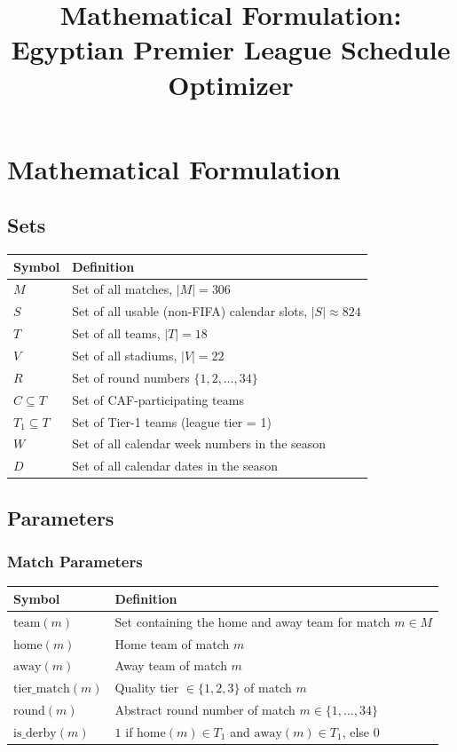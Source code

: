 \documentclass[a4paper,11pt]{article}
\title{Mathematical Formulation: Egyptian Premier League Schedule Optimizer}
\author{}
\date{}
\begin{document}
\maketitle

\section{Mathematical Formulation}

\subsection{Sets}
\begin{table}[h!]
\centering
\begin{tabularx}{\textwidth}{l X}
\toprule
\textbf{Symbol} & \textbf{Definition} \\
\midrule
$M$ & Set of all matches, $|M| = 306$ \\
$S$ & Set of all usable (non-FIFA) calendar slots, $|S| \approx 824$ \\
$T$ & Set of all teams, $|T| = 18$ \\
$V$ & Set of all stadiums, $|V| = 22$ \\
$R$ & Set of round numbers $\{1, 2, \dots, 34\}$ \\
$C \subseteq T$ & Set of CAF-participating teams \\
$T_1 \subseteq T$ & Set of Tier-1 teams (league tier = 1) \\
$W$ & Set of all calendar week numbers in the season \\
$D$ & Set of all calendar dates in the season \\
\bottomrule
\end{tabularx}
\end{table}

\subsection{Parameters}

\subsubsection{Match Parameters}
\begin{table}[h!]
\centering
\begin{tabularx}{\textwidth}{l X}
\toprule
\textbf{Symbol} & \textbf{Definition} \\
\midrule
$\text{team}(m)$ & Set containing the home and away team for match $m \in M$ \\
$\text{home}(m)$ & Home team of match $m$ \\
$\text{away}(m)$ & Away team of match $m$ \\
$\text{tier\_match}(m)$ & Quality tier $\in \{1,2,3\}$ of match $m$ \\
$\text{round}(m)$ & Abstract round number of match $m \in \{1,\dots,34\}$ \\
$\text{is\_derby}(m)$ & $1$ if $\text{home}(m) \in T_1$ and $\text{away}(m) \in T_1$, else $0$ \\
\bottomrule
\end{tabularx}
\end{table}
\end{document}
